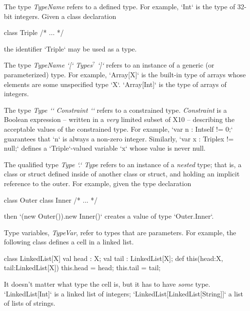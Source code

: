 The type {\em TypeName} refers to a defined type.  For example, 
\xcd`Int`
is the type of 32-bit integers.
Given a class declaration 
\begin{xten}
class Triple { /* ... */ }
\end{xten}
%
the identifier \xcd`Triple` may be used as a type.

The type {\em TypeName \xcd`[` Types{$^?$} \xcd`]`} refers to an instance of a
generic (or parameterized) type.  For example, \xcd`Array[X]` is the built-in
type of arrays whose elements are some unspecified type \xcd`X`.
\xcd`Array[Int]` is the type of arrays of integers. 

The type {\em Type \xcd`{` Constraint \xcd`}`} refers to a constrained type.
{\em Constraint} is a Boolean expression -- written in a {\em very} limited
subset of X10 -- describing the acceptable values of the constrained type.
For example, \xcd`var n : Int{self != 0};` guarantees that \xcd`n` is always a
non-zero integer. 
Similarly, \xcd`var x : Triple{x != null};` defines a \xcd`Triple`-valued
variable \xcd`x` whose value is never null.

The qualified type {\em Type \xcd`.` Type} refers to an instance of a {\em
nested} type; that is, a class or struct defined inside of another class or
struct, and holding an implicit reference to the outer.  For example, given
the type declaration 
\begin{xten}
class Outer {
  class Inner { /* ... */ }
}
\end{xten}
%
then 
\xcd`(new Outer()).new Inner()` creates a value of type 
\xcd`Outer.Inner`.

Type variables, {\em TypeVar}, refer to types that are parameters.  For
example, the following class defines a cell in a linked list.  
\begin{xten}
class LinkedList[X] {
  val head : X;
  val tail : LinkedList[X];
  def this(head:X, tail:LinkedList[X]) {
     this.head = head; this.tail = tail;
  }
}
\end{xten}
%
It doesn't
matter what type the cell is, but it has to have {\em some} type.
\xcd`LinkedList[Int]` is a linked list of integers;
\xcd`LinkedList[LinkedList[String]]` a list of lists of strings.

